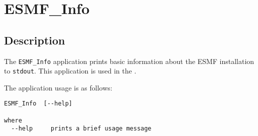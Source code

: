 
\section{ESMF\_Info}
\label{sec:ESMF_Info}

\subsection{Description}

The {\tt ESMF\_Info} application prints basic information about the ESMF 
installation to {\tt stdout}.  This application is used in the 
.

The application usage is as follows:

\begin{verbatim}
ESMF_Info  [--help]

where
  --help     prints a brief usage message
  
\end{verbatim}
